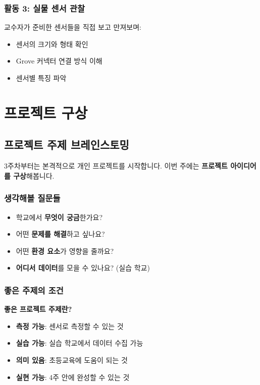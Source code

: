 \documentclass[11pt, a4paper]{article}
\begin{document}
\subsubsection{활동 3: 실물 센서 관찰}

교수자가 준비한 센서들을 직접 보고 만져보며:
\begin{itemize}
  \item 센서의 크기와 형태 확인
  \item Grove 커넥터 연결 방식 이해
  \item 센서별 특징 파악
\end{itemize}

\newpage

\section{프로젝트 구상}

\subsection{프로젝트 주제 브레인스토밍}

3주차부터는 본격적으로 개인 프로젝트를 시작합니다. 이번 주에는 \textbf{프로젝트 아이디어를 구상}해봅니다.

\subsubsection{생각해볼 질문들}

\begin{itemize}
  \item 학교에서 \textbf{무엇이 궁금}한가요?
  \item 어떤 \textbf{문제를 해결}하고 싶나요?
  \item 어떤 \textbf{환경 요소}가 영향을 줄까요?
  \item \textbf{어디서 데이터}를 모을 수 있나요? (실습 학교)
\end{itemize}

\subsubsection{좋은 주제의 조건}

\begin{keypoint}
\textbf{좋은 프로젝트 주제란?}
\begin{itemize}
  \item \textbf{측정 가능}: 센서로 측정할 수 있는 것
  \item \textbf{실습 가능}: 실습 학교에서 데이터 수집 가능
  \item \textbf{의미 있음}: 초등교육에 도움이 되는 것
  \item \textbf{실현 가능}: 4주 안에 완성할 수 있는 것
\end{itemize}
\end{keypoint}
\end{document}
